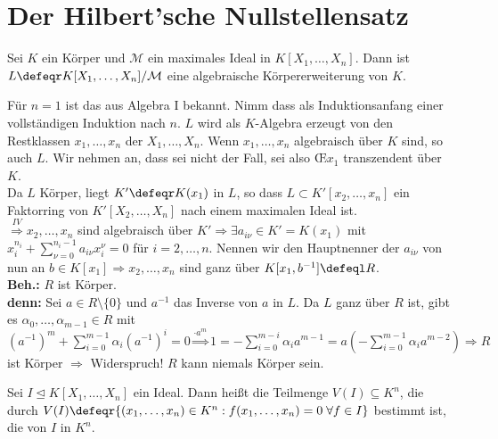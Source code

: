 \section{Der Hilbert'sche Nullstellensatz}

\begin{Satz}
\label{Satz5}
  Sei $K$ ein Körper und $\mathcal{M}$ ein maximales Ideal in $K[X_1, \dots,
  X_n]$. Dann ist $L \defeqr K[X_1, \dots, X_n] / \mathcal{M}$ eine algebraische
  Körpererweiterung von $K$.
\end{Satz}

\begin{Bew}
  Für $n=1$ ist das aus Algebra I bekannt. Nimm dass als Induktionsanfang einer
  vollständigen Induktion nach $n$.
  $L$ wird als $K$-Algebra erzeugt von den Restklassen $x_1, \dots, x_n$ der
  $X_1, \dots, X_n$. Wenn $x_1, \dots, x_n$ algebraisch über $K$ sind, so auch
  $L$. Wir nehmen an, dass sei nicht der Fall, sei also \OE $x_1$ transzendent
  über $K$.\\
  Da $L$ Körper, liegt $K' \defeqr K(x_1)$ in $L$, so dass $L \subset K'[x_2,
  \dots, x_n]$ ein Faktorring von $K'[X_2, \dots, X_n]$ nach einem maximalen
  Ideal ist.\\
  $\overset{IV}{\Rightarrow} x_2, \dots, x_n$ sind algebraisch über $K'
  \Rightarrow \exists a_{i \nu} \in K'=K(x_1)$ mit $x_i^{n_i} + \sum_{\nu =
  0}^{n_i -1} a_{i \nu} x_i^{\nu} = 0$ für $i = 2, \dots, n$.
  Nennen wir den Hauptnenner der $a_{i \nu}$ von nun an $b \in K[x_1] \Rightarrow
  x_2, \dots, x_n$ sind ganz über $K[x_1, b^{-1}] \defeql R$.\\
  \textbf{Beh.:} $R$ ist Körper.\\
  \textbf{denn:} Sei $a \in R \setminus \{0\}$ und $a^{-1}$ das Inverse von $a$
  in $L$. Da $L$ ganz über $R$ ist, gibt es $\alpha_0, \dots, \alpha_{m-1} \in
  R$ mit $(a^{-1})^m + \sum_{i = 0}^{m-1} \alpha_i (a^{-1})^i = 0 \overset{
  \cdot a^m}{\Rightarrow} 1 = -\sum_{i=0}^{m-i} \alpha_i a^{m-1} = a
  (-\sum_{i=0}^{m-1} \alpha_i a^{m-2}) \Rightarrow R$ ist Körper $\Rightarrow$
  Widerspruch! $R$ kann niemals Körper sein.
\end{Bew}

\begin{Def}
  Sei $I \trianglelefteq K[X_1, \dots, X_n]$ ein Ideal. Dann heißt die Teilmenge
  $V(I) \subseteq K^n$, die durch $V(I) \defeqr \{(x_1, \dots, x_n) \in K^n:
  f(x_1, \dots, x_n) = 0 \; \forall f \in I\}$ bestimmt ist, die
   von $I$ in $K^n$.
\end{Def}

